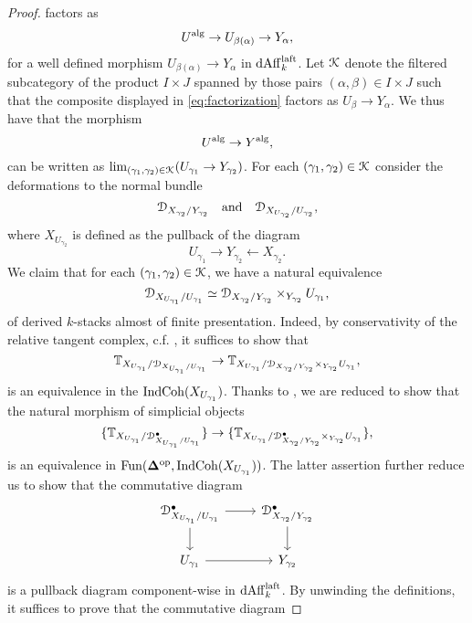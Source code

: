 \documentclass[10pt,a4paper,reqno]{amsart} %
\theoremstyle{plain}
\theoremstyle{definition}
\theoremstyle{remark}
\numberwithin{equation}{section}
\begin{document}
\begin{proof}
    factors as 
        \[U^\mathrm{alg} \to U_{\beta(\alpha)} \to Y_\alpha,\]
    for a well defined morphism $U_{\beta(\alpha)} \to Y_\alpha$ in $\mathrm{dAff}_k^{\mathrm{laft}}$.
    Let $\mathcal K$ denote the filtered subcategory of the product $I \times J$ spanned by those pairs $(\alpha, \beta) \in I \times J$
    such that the composite displayed in \eqref{eq:factorization} factors as $U_\beta \to Y_\alpha$. We thus have that the morphism
        \[
            U ^\mathrm{alg} \to Y^\mathrm{alg} ,  
        \]
    can be written as $\lim_{(\gamma_1, \gamma_2) \in \mathcal K} (U_{\gamma_1} \to Y_{\gamma_2})$. For each $(\gamma_1, \gamma_2) \in \mathcal K$ consider the deformations to the normal bundle
        \[
            \mathcal D_{X_{\gamma_2}/ Y_{\gamma_2}} \quad \mathrm{and} \quad \mathcal D_{X_{U_{\gamma_2}}/ U_{\gamma_2}},
        \]
    where $X_{U_{\gamma_2}}$ is defined as the pullback of the diagram
        \[
            U_{\gamma_1} \to Y_{\gamma_2} \leftarrow X_{\gamma_2}.  
        \]
    We claim that for each $(\gamma_1, \gamma_2) \in \mathcal K$, we have a natural equivalence
        \[
            \mathcal D_{X_{U_{\gamma_1}}/ U_{\gamma_1}} \simeq \mathcal D_{X_{\gamma_2}/ Y_{\gamma_2}} \times_{Y_{\gamma_2}} U_{\gamma_1},  
        \]
    of derived $k$-stacks almost of finite presentation. Indeed, by conservativity of the relative tangent complex, c.f. \cite[\S 5, Theorem 2.3.5]{Gaitsgory_Study_II}, it suffices to show that 
        \[
            \mathbb T_{X_{U_{\gamma_1}}/ \mathcal D_{X_{U_{\gamma_1}}/ U_{\gamma_1}}} \to \mathbb T_{X_{U_{\gamma_1}}/ \mathcal D_{X_{\gamma_2}/ Y_{\gamma_2}} \times_{Y_{\gamma_2}} U_{\gamma_1}},
        \]
    is an equivalence in the \infcat $\mathrm{Ind}\mathrm{Coh}(X_{U_{\gamma_1}})$. Thanks to \cite[\S 5, Corollary 2.3.6]{Gaitsgory_Study_II}, we are reduced to show that
    the natural morphism of simplicial objects
        \[
            \{ \mathbb T_{X_{U_{\gamma_1}}/ \mathcal D_{X_{U_{\gamma_1}}/ U_{\gamma_1}}^{\bullet}} \} \to \{ \mathbb T_{X_{U_{\gamma_1}}/ \mathcal D_{X_{\gamma_2}/ Y_{\gamma_2}}^{\bullet} \times_{Y_{\gamma_2}} U_{\gamma_1}} \},
        \]
    is an equivalence in $\operatorname{Fun}(\bm{\Delta}^\mathrm{op}, \mathrm{Ind}\mathrm{Coh}(X_{U_{\gamma_1}}))$. The latter assertion further reduce us to show that the commutative
    diagram
        \[
        \begin{tikzcd}
            \cD_{X_{U_{\gamma_1}}/ U_{\gamma_1}}^{ \bullet} \ar{r} \ar{d} & \cD_{X_{\gamma_2}/ Y_{\gamma_2}}^{\bullet} \ar{d} \\
            U_{\gamma_1} \ar{r} & Y_{\gamma_2} 
        \end{tikzcd}
        \]
    is a pullback diagram component-wise in $\mathrm{dAff}_k^{\mathrm{laft}}$. By unwinding the definitions, it suffices to prove that the commutative diagram

\end{proof}
\end{document}
